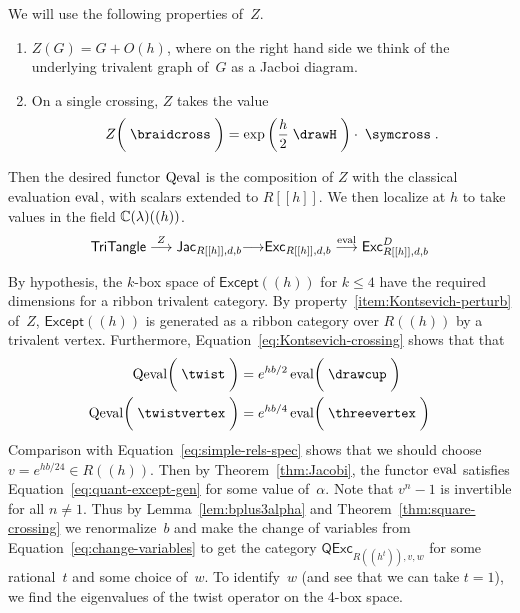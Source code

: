 \documentclass[12pt]{amsart}
\begin{document}
We will use the following properties of~$Z$.
\begin{enumerate}
\item\label{item:Kontsevich-perturb} $Z(G) = G + O(h)$, where on the
  right hand side we think of the
  underlying trivalent graph of~$G$ as a Jacboi diagram.
\item\label{item:Kontsevich-crossing} On a single crossing, $Z$ takes
  the value
  \begin{equation}
    \label{eq:Kontsevich-crossing}
    Z\biggl(\;\braidcross\;\biggr) =
    \exp\left(\frac{h}{2}\;\drawH\;\right)
    \cdot\; \symcross\;.
  \end{equation}
\end{enumerate}

Then the desired functor $\operatorname{Qeval}$ is the composition of $Z$ with the
classical evaluation $\operatorname{eval}$, with scalars extended to $R[[h]]$. We
then localize at $h$ to take values in the field
$\mathbb C(\lambda)((h))$.
\[
  \mathsf{TriTangle} \overset{Z}{\longrightarrow}
  \mathsf{Jac}_{R[[h]],d,b} {\longrightarrow}
  \mathsf{Exc}_{R[[h]],d,b} \overset{\operatorname{eval}}{\longrightarrow}
  \mathsf{Exc}^D_{R[[h]],d,b}
\]

By hypothesis, the $k$-box space of $\mathsf{Except}((h))$ for $k \le 4$
have the required dimensions for a ribbon trivalent category. By
property~\eqref{item:Kontsevich-perturb} of~$Z$,
$\mathsf{Except}((h))$
is generated as a ribbon category over $R((h))$ by a
trivalent vertex.
Furthermore, Equation~\eqref{eq:Kontsevich-crossing} shows that
 that
\begin{align*}
  \Qeval\biggl(\;\twist\;\biggr) &= e^{hb/2}\eval\biggl(\;\drawcup\;\biggr)\\
  \Qeval\biggl(\;\twistvertex\;\biggr) &= e^{hb/4}\eval\biggl(\;\threevertex\;\biggr)
\end{align*}
Comparison with Equation~\eqref{eq:simple-rels-spec} shows that we
should choose $v = e^{hb/24} \in R((h))$. Then by Theorem~\ref{thm:Jacobi}, the
functor $\operatorname{eval}$ satisfies Equation~\eqref{eq:quant-except-gen} for
some value of~$\alpha$. Note that $v^n - 1$ is
invertible for all $n \ne 1$. Thus by Lemma~\ref{lem:bplus3alpha} and
Theorem~\ref{thm:square-crossing} we renormalize~$b$ and make the
change of variables
from Equation~\eqref{eq:change-variables} to get the category
$\mathsf{QExc}_{R((h^t)),v,w}$ for some rational~$t$ and some choice
of~$w$. To identify~$w$ (and see that we can take $t=1$), 
we find the eigenvalues
of the twist operator on the 4-box space.
\end{document}
